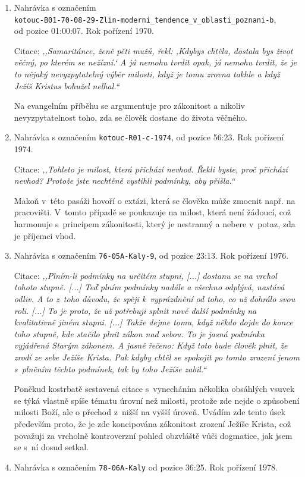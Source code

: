 \begin{enumerate}
  \item{
    Nahrávka s označením \\
    \texttt{kotouc-B01-70-08-29-Zlin-moderni\_tendence\_v\_oblasti\_poznani-b},\\
    od pozice 01:00:07.  Rok pořízení 1970.

    Citace: \textit{%
      ,,Samaritánce, ženě pěti mužů, řekl: ,Kdybys chtěla, dostala bys život
      věčný, po kterém se nežízní.` A já nemohu tvrdit opak, já nemohu tvrdit,
      že je to nějaký nevyzpytatelný výběr milosti, když je tomu zrovna takhle a
      když Ježíš Kristus bohužel nelhal.``
    }

    Na evangelním příběhu se argumentuje pro zákonitost a nikoliv
    nevyzpytatelnost toho, zda se člověk dostane do života věčného.
  }
  \item{
    Nahrávka s označením \texttt{kotouc-R01-c-1974}, od pozice 56:23.
    Rok pořízení 1974.

    Citace: \textit{%
      ,,Tohleto je milost, která přichází nevhod. Řekli byste, proč přichází
      nevhod? Protože jste nechtěně vystihli podmínky, aby přišla.``
    }

    Makoň v~této pasáži hovoří o extázi, která se člověka může zmocnit např. na
    pracovišti. V~tomto případě se poukazuje na milost, která není žádoucí, což
    harmonuje s~principem zákonitosti, který je nestranný a nebere v~potaz, zda
    je příjemci vhod.
  }
  \item{
    Nahrávka s označením \texttt{76-05A-Kaly-9}, od pozice 23:13.
    Rok pořízení 1976.

    Citace: \textit{%
      ,,Plním-li podmínky na určitém stupni, [...] dostanu se na vrchol tohoto
      stupně. [...] Teď plním podmínky nadále a všechno odplývá, nastává odliv.
      A to z~toho důvodu, že spěji k~vyprázdnění od toho, co už dohrálo svou
      roli. [...] To je proto, že už potřebuji splnit nové další podmínky na
      kvalitativně jiném stupni. [...] Takže dejme tomu, když někdo dojde do
      konce toho stupně, kde stačilo plnit zákon nad sebou. To je jasná podmínka
      vyjádřená Starým zákonem. A jasně řečeno: Když toto bude člověk plnit, že
      zrodí ze sebe Ježíše Krista. Pak kdyby chtěl se spokojit po tomto zrození
      jenom s~plněním těchto podmínek, tak by toho Ježíše zabil.``
    }

    Poněkud kostrbatě sestavená citace s~vynecháním několika obsáhlých vsuvek se
    týká vlastně spíše tématu úrovní než milosti, protože zde nejde o způsobení
    milosti Boží, ale o přechod z~nižší na vyšší úroveň. Uvádím zde tento úsek
    především proto, že je zde koncipována zákonitost zrození Ježíše Krista, což
    považuji za vrcholně kontroverzní pohled obzvláště vůči dogmatice, jak jsem
    se s~ní dosud setkal.
  }
  \item{
    Nahrávka s označením \texttt{78-06A-Kaly} od pozice 36:25.
    Rok pořízení 1978.

}
\end{enumerate}
